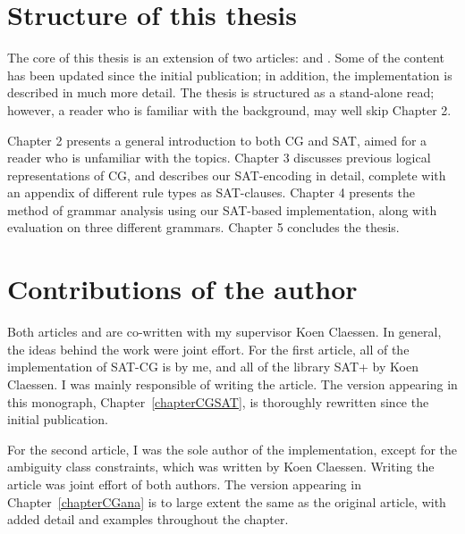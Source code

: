 \section{Structure of this thesis}

The core of this thesis is an extension of two articles: \cite{listenmaa_claessen2015} and \cite{listenmaa_claessen2016}. Some of the content has been updated since the initial publication; in addition, the implementation is described in much more detail. The thesis is structured as a stand-alone read; however, a reader who is familiar with the background, may well skip Chapter 2.

Chapter 2 presents a general introduction to both CG and SAT, aimed for a reader who is unfamiliar with the topics.
Chapter 3 discusses previous logical representations of CG, and describes our SAT-encoding in detail, complete with an appendix of different rule types as SAT-clauses.
Chapter 4 presents the method of grammar analysis using our SAT-based implementation, along with evaluation on three different grammars.
Chapter 5 concludes the thesis.


\section{Contributions of the author}

Both articles \cite{listenmaa_claessen2015} and \cite{listenmaa_claessen2016}
are co-written with my supervisor Koen Claessen. In general, the ideas behind the work were joint effort.
For the first article, all of the implementation of SAT-CG is by me,
and all of the library SAT+ by Koen Claessen.
I was mainly responsible of writing the article. The version appearing in this monograph, Chapter~\ref{chapterCGSAT}, is thoroughly rewritten since the initial publication.

For the second article, I was the sole author of the implementation, 
except for the ambiguity class constraints, which was written by Koen Claessen. 
Writing the article was joint effort of both authors. The version appearing in Chapter~\ref{chapterCGana} is to large extent the same as the original article, with added detail and examples throughout the chapter.


